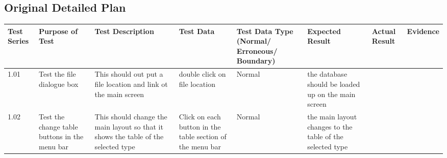 \begin{landscape}
\subsection{Original Detailed Plan}

\begin{center}
    \begin{longtable}{|p{1.5cm}|p{2.5cm}|p{2.5cm}|p{2cm}|p{2cm}|p{2cm}|p{2cm}|p{2cm}|}
        \hline
        \textbf{Test Series} & \textbf{Purpose of Test} & \textbf{Test Description} & \textbf{Test Data} & \textbf{Test Data Type (Normal/ Erroneous/ Boundary)} & \textbf{Expected Result} & \textbf{Actual Result} & \textbf{Evidence}\\ \hline
        1.01 & Test the file dialogue box & This should out put a file location and link ot the main screen & double click on file location & Normal & the database should be loaded up on the main screen &  &  \\ \hline
        
        1.02 & Test the change table buttons in the menu bar  & This should change the main layout so that it shows the table of the selected type & Click on each button in the table section of the menu bar & Normal & the main layout changes to the table of the selected type & & \\ \hline
        

\end{longtable}
\end{center}
\end{landscape}
